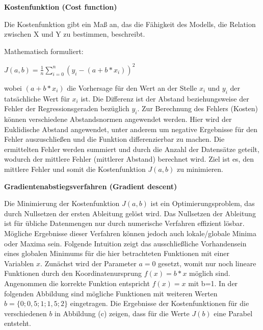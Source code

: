 \begin{enumerate}
\textbf {Kostenfunktion (Cost function)}

Die Kostenfunktion gibt ein Maß an, das die Fähigkeit des Modells, die Relation zwischen X und Y zu bestimmen, beschreibt. 

Mathematisch formuliert:

$J (a,b)=\frac{1}{n}\sum_{i=0}^{n} (y_i-(a+b*x_i))^{2}$ 


wobei $(a+b*x_i)$ die Vorhersage für den Wert an der Stelle $x_i$ und $y_i$ der tatsächliche Wert für $x_i$ ist. Die Differenz ist der Abstand beziehungsweise der Fehler der Regressionsgeraden bezüglich $y_i$. Zur Berechnung des Fehlers (Kosten) können verschiedene Abstandsnormen angewendet werden. Hier wird der Euklidische Abstand angewendet, unter anderem um negative Ergebnisse für den Fehler auszuschließen und die Funktion differenzierbar zu machen.
Die ermittelten Fehler werden summiert und durch die Anzahl der Datensätze geteilt, wodurch der mittlere Fehler (mittlerer Abstand) berechnet wird. Ziel ist es, den mittlere Fehler und somit die Kostenfunktion $J(a,b)$ zu minimieren.

\textbf {Gradientenabstiegsverfahren (Gradient descent)}

Die Minimierung der Kostenfunktion $J(a,b)$ ist ein Optimierungsproblem, das durch Nullsetzen der ersten Ableitung gelöst wird. Das Nullsetzen der Ableitung ist für übliche Datenmengen nur durch numerische Verfahren effizient lösbar. Mögliche Ergebnisse dieser Verfahren können jedoch  auch lokale/globale Minima oder Maxima sein. Folgende Intuition zeigt das ausschließliche Vorhandensein eines globalen Minimums für die hier betrachteten Funktionen mit einer Variablen $x$. Zunächst wird der Parameter $a=0$ gesetzt, womit nur noch lineare Funktionen durch den Koordinatenursprung $f(x)=b*x$ möglich sind. 
Angenommen die korrekte Funktion entspricht $f(x)=x$ mit b=1. In der folgenden Abbildung sind mögliche Funktionen mit weiteren Werten $b=\{0; 0,5; 1; 1,5; 2\}$ eingetragen. Die Ergebnisse der Kostenfunktionen für die verschiedenen $b$ in Abbildung (c) zeigen, dass für die Werte $J(b)$ eine Parabel entsteht.  


\end{enumerate}
